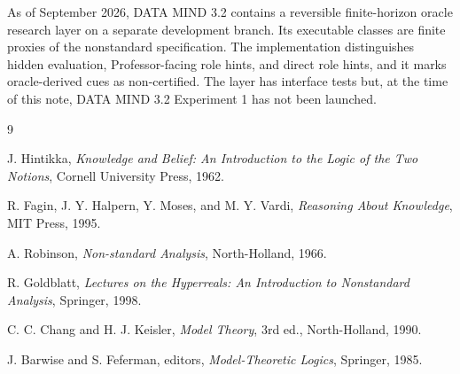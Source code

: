 \documentclass[11pt]{article}
\begin{document}
As of September 2026, DATA MIND 3.2 contains a reversible finite-horizon oracle research layer on a separate development branch. Its executable classes are finite proxies of the nonstandard specification. The implementation distinguishes hidden evaluation, Professor-facing role hints, and direct role hints, and it marks oracle-derived cues as non-certified. The layer has interface tests but, at the time of this note, DATA MIND 3.2 Experiment 1 has not been launched.

\begin{thebibliography}{9}

J. Hintikka,
\emph{Knowledge and Belief: An Introduction to the Logic of the Two Notions},
Cornell University Press, 1962.

R. Fagin, J. Y. Halpern, Y. Moses, and M. Y. Vardi,
\emph{Reasoning About Knowledge},
MIT Press, 1995.

A. Robinson,
\emph{Non-standard Analysis},
North-Holland, 1966.

R. Goldblatt,
\emph{Lectures on the Hyperreals: An Introduction to Nonstandard Analysis},
Springer, 1998.

C. C. Chang and H. J. Keisler,
\emph{Model Theory}, 3rd ed.,
North-Holland, 1990.

J. Barwise and S. Feferman, editors,
\emph{Model-Theoretic Logics},
Springer, 1985.

\end{thebibliography}
\end{document}
